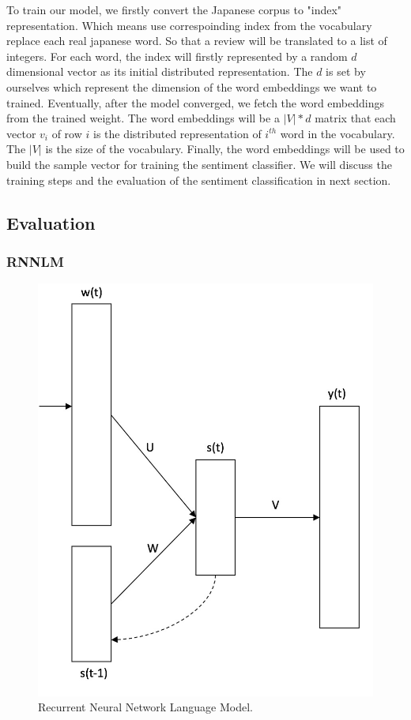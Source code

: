 \documentclass{article}
\begin{document}
To train our model, we firstly convert the Japanese corpus to "index" representation. Which means use correspoinding index from the vocabulary replace each real japanese word. So that a review will be translated to a list of integers. For each word, the index will firstly represented by a random $d$ dimensional vector as its initial distributed representation. The $d$ is set by ourselves which represent the dimension of the word embeddings we want to trained. Eventually, after the model converged, we fetch the word embeddings from the trained weight. The word embeddings will be a $\left| V\right| \ast d$ matrix that each vector $v_{i}$ of row $i$ is the distributed representation of $i^{th}$ word in the vocabulary. The $\left| V\right|$ is the size of the vocabulary. Finally, the word embeddings will be used to build the sample vector for training the sentiment classifier. We will discuss the training steps and the evaluation of the sentiment classification in next section.


\subsection{Evaluation}

\subsubsection{RNNLM}

\begin{figure}[htb]
\centering
\includegraphics[scale=0.2]{RNNLM.png}
\caption{Recurrent Neural Network Language Model.}
\label{fig:rnnlm}
\end{figure}
\end{document}
